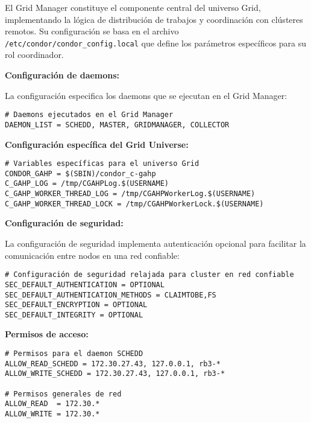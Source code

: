 El Grid Manager constituye el componente central del universo Grid, implementando la lógica de distribución de trabajos y coordinación con clústeres remotos. Su configuración se basa en el archivo \texttt{/etc/condor/condor\_config.local} que define los parámetros específicos para su rol coordinador.

\textbf{Configuración de daemons:}

La configuración especifica los daemons que se ejecutan en el Grid Manager:

\begin{verbatim}
# Daemons ejecutados en el Grid Manager
DAEMON_LIST = SCHEDD, MASTER, GRIDMANAGER, COLLECTOR
\end{verbatim}

\textbf{Configuración específica del Grid Universe:}

\begin{verbatim}
# Variables específicas para el universo Grid
CONDOR_GAHP = $(SBIN)/condor_c-gahp
C_GAHP_LOG = /tmp/CGAHPLog.$(USERNAME)
C_GAHP_WORKER_THREAD_LOG = /tmp/CGAHPWorkerLog.$(USERNAME)
C_GAHP_WORKER_THREAD_LOCK = /tmp/CGAHPWorkerLock.$(USERNAME)
\end{verbatim}

\textbf{Configuración de seguridad:}

La configuración de seguridad implementa autenticación opcional para facilitar la comunicación entre nodos en una red confiable:

\begin{verbatim}
# Configuración de seguridad relajada para cluster en red confiable
SEC_DEFAULT_AUTHENTICATION = OPTIONAL
SEC_DEFAULT_AUTHENTICATION_METHODS = CLAIMTOBE,FS
SEC_DEFAULT_ENCRYPTION = OPTIONAL
SEC_DEFAULT_INTEGRITY = OPTIONAL
\end{verbatim}

\textbf{Permisos de acceso:}

\begin{verbatim}
# Permisos para el daemon SCHEDD
ALLOW_READ_SCHEDD = 172.30.27.43, 127.0.0.1, rb3-*
ALLOW_WRITE_SCHEDD = 172.30.27.43, 127.0.0.1, rb3-*

# Permisos generales de red
ALLOW_READ  = 172.30.*
ALLOW_WRITE = 172.30.*
\end{verbatim}

